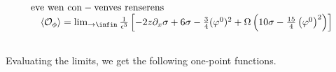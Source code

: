 \documentclass{article}
\begin{document}
\begin{equation}
\begin{array} { r l r } & { \mathrm { e v e ~ w e n ~ c o n - v e n v e s ~ r e n s e r e n s } } & { } \\ & { \quad \langle \mathcal { O } _ { \phi } \rangle = \operatorname* { l i m } _ { \rightarrow \infin } \frac { 1 } { \epsilon ^ { 3 } } \left [ - 2 z \partial _ { x } \sigma + 6 \sigma - \frac { 3 } { 4 } ( \varphi ^ { 0 } ) ^ { 2 } + \Omega \left ( 1 0 \sigma - \frac { 1 5 } { 4 } \left ( \varphi ^ { 0 } \right ) ^ { 2 } \right ) \right ] } \\ &\end{array}
\end{equation}


Evaluating the limits, we get the following one-point functions.


\begin{equation}
\begin{array} { c c } { { } } & { { } } \\ { { } } & { { } { } { } { } { } { } { } { } { } { } { } { } { } { } { } { } { } { } { } { } { } { } { } { } { } { } { } { } { } { } { } { } { } { } { } { } { } { } { } { } { } { } { } { } { } { } { } { } { } { } { } { } { } { } { } { } { } { } { } { } { } { } { } { }}\end{array}
\end{equation}
\end{document}
